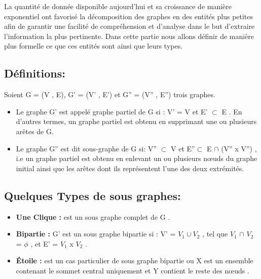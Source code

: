 
	La quantité de donnée disponible aujourd'hui et sa croissance de manière exponentiel ont favorisé la décomposition des graphes en des entités plus petites afin de garantir une facilité de compréhension et d'analyse dans le but d'extraire l'information la plus pertinente. Dans cette partie nous allons définir de manière plus formelle ce que ces entités sont ainsi que leurs types.
	
		
		
		
		\subsection{Définitions:}
		Soient G = (V , E), G' = (V' , E') et G'' = (V'' , E'') trois graphes.
		\begin{itemize}[label=$\circ$]
		
			\item Le graphe G' est appelé graphe partiel de G si : V' = V et E' $\subset$ E \citep{DUT}. En d'autres termes, un graphe partiel est obtenu en supprimant une ou plusieurs arêtes de G.
				

			\item Le graphe G'' est dit sous-graphe de G si: V'' $\subset$ V et 
			 E''$\subset$ E $\cap$ (V'' x V'') \citep{bac}, i.e un graphe partiel est obtenu en enlevant un ou plusieurs nœuds du graphe initial ainsi que les arêtes dont ils représentent l'une des deux extrémités.
			 
		\end{itemize}
		
		\subsection{Quelques Types de sous graphes:}
		
		\begin{itemize} [label = $\bullet$]
		
		
			\item \textbf{Une Clique :} est un sous graphe complet de G \citep{bac}.
			
			\item \textbf{Bipartie :} G' est un sous graphe bipartie si : V' = $V_{1} \cup V_{2}$ , tel que $V_{1}$ $\cap$ $V_{2}$ = $\phi$ , et E' = $V_{1}$ x $V_{2}$ \citep{bac}.
			
			\item \textbf{Étoile :}
			 est un cas particulier de sous graphe bipartie ou X est un ensemble contenant le sommet central uniquement et Y contient le reste des nœuds \citep{koutra2015summarizing} .
			
			 
		\end{itemize}